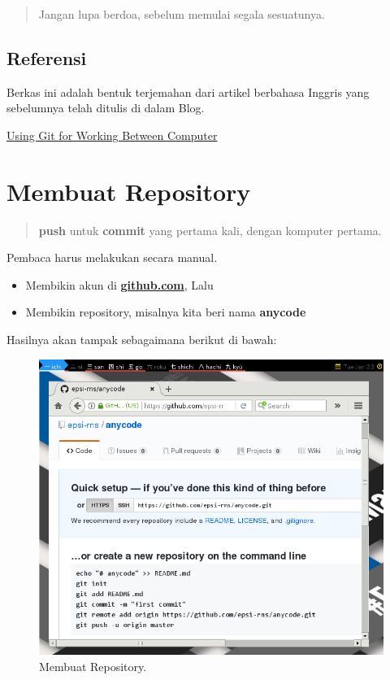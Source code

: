 \documentclass{article}
\begin{document}
\begin{quote}
Jangan lupa berdoa, sebelum memulai segala sesuatunya.
\end{quote}

\subsection{Referensi}

Berkas ini adalah bentuk terjemahan dari artikel berbahasa Inggris yang sebelumnya telah ditulis di dalam Blog.

\href{http://epsi-rns.github.io/opensource/2018/01/15/using-git.html}{Using Git for Working Between Computer}

\newpage

\section{Membuat Repository}

\begin{quote}
\textbf{push} untuk \textbf{commit} yang pertama kali, dengan komputer pertama.
\end{quote}

Pembaca harus melakukan secara manual.

\begin{itemize}
\item Membikin akun di \textbf{\href{https://github.com}{github.com}}, Lalu
\item Membikin repository, misalnya kita beri nama \textbf{anycode}
\end{itemize}

Hasilnya akan tampak sebagaimana berikut di bawah:

\begin{figure}[H]
  \includegraphics[width=\linewidth]{github-create-account.png}
  \caption{Membuat Repository.}
  \label{fig:git.create}
\end{figure}
\end{document}
